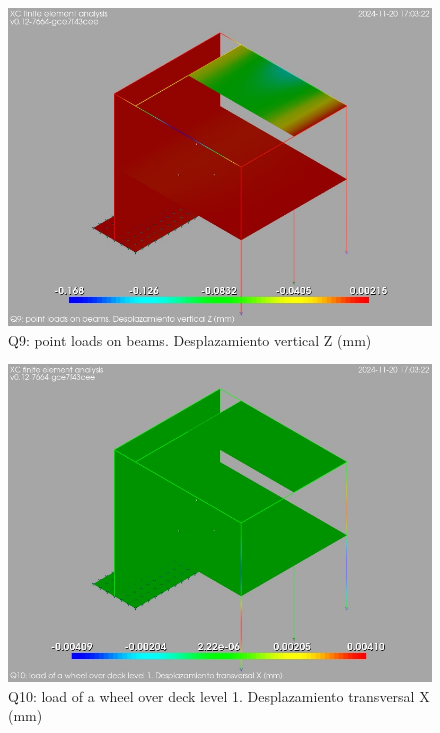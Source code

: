\begin{figure}[ht]
\begin{center}
\includegraphics[width=\linewidth]{results/graphics/resSimplLC/QpntBeamsuZ.png}
\caption{Q9: point loads on beams. Desplazamiento vertical Z (mm)}
\label{QpntBeamsuZ}
\end{center}
\end{figure}
\begin{figure}[ht]
\begin{center}
\includegraphics[width=\linewidth]{results/graphics/resSimplLC/QwheelDeck1uX.png}
\caption{Q10: load of a wheel over deck level 1. Desplazamiento transversal X (mm)}
\label{QwheelDeck1uX}
\end{center}
\end{figure}
